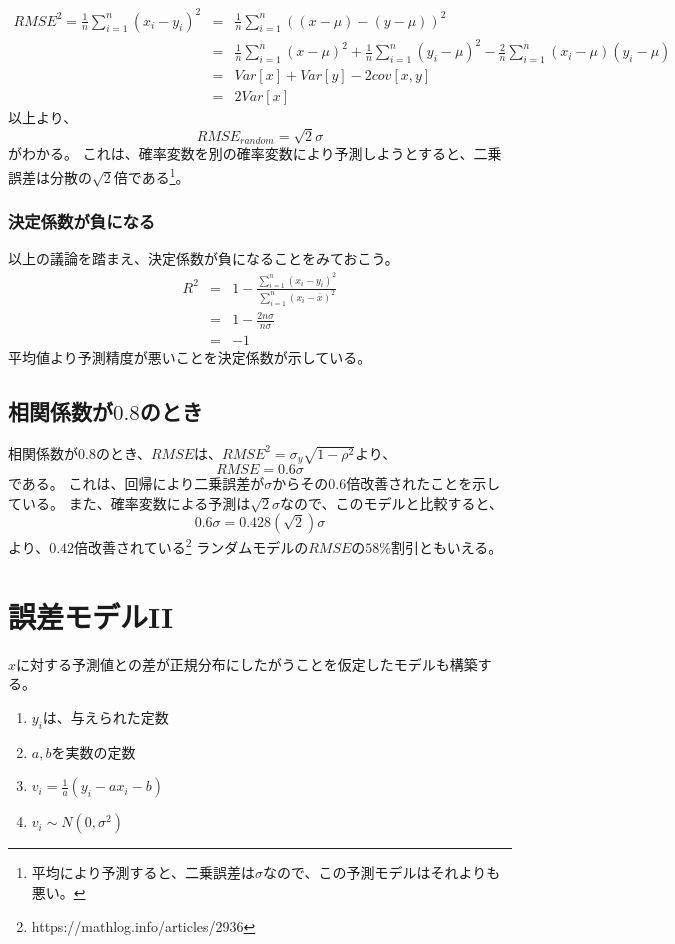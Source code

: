 \begin{eqnarray*}
 RMSE^2=\frac{1}{n}\sum_{i=1}^n (x_i-y_i)^2 &=& \frac{1}{n}\sum_{i=1}^n \left( (x-\mu)-(y-\mu)\right) ^2\\
 &=& \frac{1}{n}\sum_{i=1}^n (x-\mu)^2+\frac{1}{n}\sum_{i=1}^n(y_i-\mu)^2-\frac{2}{n}\sum_{i=1}^n(x_i-\mu)(y_i-\mu) \\
 &=& Var[x]+Var[y]-2cov[x,y] \\
 &=& 2Var[x]
\end{eqnarray*}
以上より、
\begin{equation*}
 RMSE_{random} = \sqrt{2}\sigma
\end{equation*}
がわかる。
これは、確率変数を別の確率変数により予測しようとすると、二乗誤差は分散の$\sqrt{2}$倍である\footnote{平均により予測すると、二乗誤差は$\sigma$なので、この予測モデルはそれよりも悪い。}。

\subsubsection{決定係数が負になる}
以上の議論を踏まえ、決定係数が負になることをみておこう。
\begin{eqnarray*}
 R^2 &=& 1-\frac{\sum_{i=1}^n (x_i-y_i)^2}{\sum_{i=1}^n (x_i-\bar{x})^2}\\
 &=& 1-\frac{2n\sigma}{n\sigma}\\
 &=& -1
\end{eqnarray*}
平均値より予測精度が悪いことを決定係数が示している。


\subsection{相関係数が$0.8$のとき}
相関係数が$0.8$のとき、$RMSE$は、$RMSE^2 = \sigma_y\sqrt{1-\rho^2}$より、
\begin{equation*}
 RMSE = 0.6\sigma
\end{equation*}
である。
これは、回帰により二乗誤差が$\sigma$からその$0.6$倍改善されたことを示している。
また、確率変数による予測は$\sqrt{2}\sigma$なので、このモデルと比較すると、
\begin{equation*}
 0.6\sigma = 0.428(\sqrt{2})\sigma
\end{equation*}
より、$0.42倍$改善されている\footnote{https://mathlog.info/articles/2936}
ランダムモデルの$RMSE$の$58\%$割引ともいえる。


\section{誤差モデルII}
$x$に対する予測値との差が正規分布にしたがうことを仮定したモデルも構築する。
\begin{enumerate}
 \item $y_i$は、与えられた定数
 \item $a,b$を実数の定数
 \item $v_i = \frac{1}{a}(y_i-a x_i -b)$
 \item $v_i \sim N(0,\sigma^2)$
\end{enumerate}



